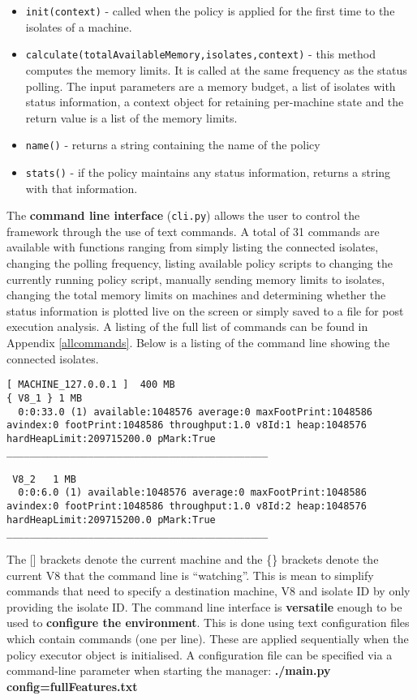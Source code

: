 \documentclass{l4proj}
\begin{document}
\begin{itemize}
\item \texttt{init(context)} - called when the policy is applied for the first time to the isolates of a machine.
\item \texttt{calculate(totalAvailableMemory,isolates,context)} - this method computes the memory limits. It is called at the same frequency as the status polling. The input parameters are a memory budget, a list of isolates with status information, a context object for retaining per-machine state and the return value is a list of the memory limits.
\item \texttt{name()} - returns a string containing the name of the policy
\item \texttt{stats()} - if the policy maintains any status information, returns a string with that information.
\end{itemize}
\hspace*{1em} The \textbf{command line interface} (\texttt{cli.py}) allows the user to control the framework through the use of text commands. A total of 31 commands are available with functions ranging from simply listing the connected isolates, changing the polling frequency, listing available policy scripts to changing the currently running policy script, manually sending memory limits to isolates, changing the total memory limits on machines and determining whether the status information is plotted live on the screen or simply saved to a file for post execution analysis. A listing of the full list of commands can be found in Appendix \ref{allcommands}. Below is a listing of the command line showing the connected isolates.
\begin{lstlisting}
[ MACHINE_127.0.0.1 ]  400 MB
{ V8_1 } 1 MB
  0:0:33.0 (1) available:1048576 average:0 maxFootPrint:1048586 avindex:0 footPrint:1048586 throughput:1.0 v8Id:1 heap:1048576 hardHeapLimit:209715200.0 pMark:True 
_____________________________________________

 V8_2   1 MB
  0:0:6.0 (1) available:1048576 average:0 maxFootPrint:1048586 avindex:0 footPrint:1048586 throughput:1.0 v8Id:2 heap:1048576 hardHeapLimit:209715200.0 pMark:True 
_____________________________________________
\end{lstlisting}
\hspace*{1em} The [] brackets denote the current machine and the \{\} brackets denote the current V8 that the command line is ``watching''. This is mean to simplify commands that need to specify a destination machine, V8 and isolate ID by only providing the isolate ID. The command line interface is \textbf{versatile} enough to be used to \textbf{configure the environment}. This is done using text configuration files which contain commands (one per line). These are applied sequentially when the policy executor object is initialised. A configuration file can be specified via a command-line parameter when starting the manager: \textbf{./main.py config=fullFeatures.txt} 
\end{document}
